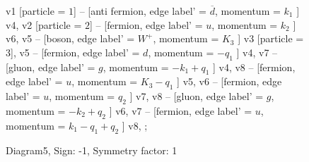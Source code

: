 \documentclass{revtex4}
\begin{document}
\begin{figure}[!htb]
\begin{center}
{    %
v1 [particle = \(1\)] -- [anti fermion, edge label' = \(\overline{d}\), momentum = \(k_{1}\) ] v4, 
v2 [particle = \(2\)] -- [fermion, edge label' = \(u\), momentum = \(k_{2}\) ] v6, 
v5 -- [boson, edge label' = \(W^{+}\), momentum = \(K_{3}\) ] v3 [particle = \(3\)], 
v5 -- [fermion, edge label' = \(d\), momentum = \(-q_{1}\) ] v4, 
v7 -- [gluon, edge label' = \(g\), momentum = \(-k_{1} + q_{1}\) ] v4, 
v8 -- [fermion, edge label' = \(u\), momentum = \(K_{3} - q_{1}\) ] v5, 
v6 -- [fermion, edge label' = \(u\), momentum = \(q_{2}\) ] v7, 
v8 -- [gluon, edge label' = \(g\), momentum = \(-k_{2} + q_{2}\) ] v6, 
v7 -- [fermion, edge label' = \(u\), momentum = \(k_{1} - q_{1} + q_{2}\) ] v8, 
};
\end{center}
\caption{Diagram5, Sign: -1, Symmetry factor: 1}
\end{figure}
\newpage
\end{document}
